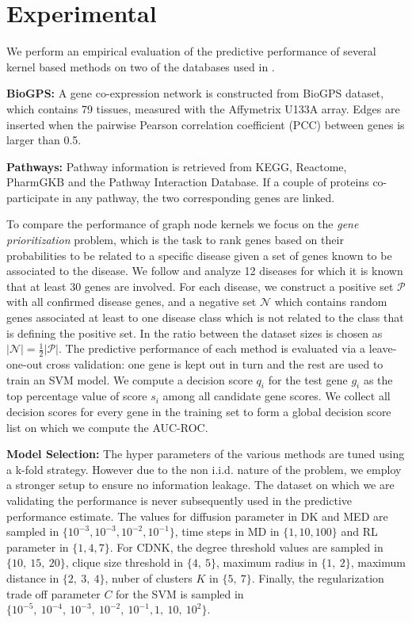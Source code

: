 \documentclass[review]{elsarticle}
\begin{document}
\section{Experimental}
We perform an empirical evaluation of the predictive performance of several kernel based methods on two of the databases used in \cite{chen2014disease}.

\textbf{BioGPS:} A gene co-expression network is constructed from BioGPS dataset, which contains 79 tissues, measured with the Affymetrix U133A array. Edges are inserted when the pairwise Pearson correlation coefficient (PCC) between genes is larger than 0.5.

\textbf{Pathways:} Pathway information is retrieved from KEGG, Reactome, PharmGKB and the Pathway Interaction Database. If a couple of proteins co-participate in any pathway, the two corresponding genes are linked.  

To compare the performance of graph node kernels we focus on the {\em gene prioritization} problem, which is the task to rank genes based on their probabilities to be related to a specific disease given a set of genes known to be associated to the disease. We follow \cite{chen2014disease} and analyze  12 diseases \cite{goh2007human} for which it is known that at least 30 genes are involved. For each disease, we construct a positive set $\mathcal{P}$ with all confirmed disease genes, and a negative set $\mathcal{N}$ which contains random genes associated at least to one disease class which is not related to the class that is defining the positive set. In \cite{chen2014disease} the ratio between the dataset sizes is chosen as $\vert \mathcal{N} \vert = \frac{1}{2} \vert \mathcal{P} \vert$. The predictive performance of each method is evaluated via a leave-one-out cross validation: one gene is kept out in turn and the rest are used to train an SVM model. We compute a decision score $q_i$ for the test gene $g_i$ as the top percentage value of score $s_i$ among all candidate gene scores. We collect all decision scores for every gene in the training set to form a global decision score list on which we compute the AUC-ROC.

\textbf{Model Selection:}
The hyper parameters of the various methods are tuned using a k-fold strategy. However due to the non i.i.d. nature of the problem, we employ a stronger setup to ensure no information leakage. The dataset on which we are validating the performance is never subsequently used in the predictive performance estimate. The values for diffusion parameter in DK and MED are sampled in $\lbrace 10^{-3}, 10^{-3}, 10^{-2}, 10^{-1} \rbrace$, time steps in MD in $\lbrace 1, 10, 100 \rbrace$ and RL parameter in $\lbrace 1, 4, 7 \rbrace$. For CDNK, the degree threshold values are sampled in $\lbrace 10,\ 15,\ 20 \rbrace$, clique size threshold in $\lbrace 4,\ 5 \rbrace$, maximum radius in $\lbrace 1,\ 2 \rbrace$, maximum distance in $\lbrace 2,\ 3,\ 4 \rbrace$, nuber of clusters $K$ in $\lbrace 5,\ 7 \rbrace$. Finally, the regularization trade off parameter $C$ for the SVM is sampled in $\lbrace 10^{-5},  \ 10^{-4}, \ 10^{-3},\ 10^{-2},\ 10^{-1}, 1,\ 10,\ 10^2 \rbrace$.
\end{document}
